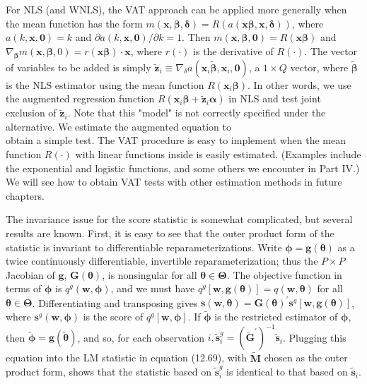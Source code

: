 \documentclass[10pt]{article}
\begin{document}
For NLS (and WNLS), the VAT approach can be applied more generally when the mean function has the form $m(\mathbf{x}, \boldsymbol{\beta}, \boldsymbol{\delta})=R(a(\mathbf{x} \boldsymbol{\beta}, \mathbf{x}, \boldsymbol{\delta}))$, where $a(k, \mathbf{x}, \mathbf{0})=k$ and $\partial a(k, \mathbf{x}, \mathbf{0}) / \partial k=1$. Then $m(\mathbf{x}, \boldsymbol{\beta}, \mathbf{0})=R(\mathbf{x} \boldsymbol{\beta})$ and $\nabla_{\boldsymbol{\beta}} m(\mathbf{x}, \boldsymbol{\beta}, 0)=r(\mathbf{x} \boldsymbol{\beta}) \cdot \mathbf{x}$, where $r(\cdot)$ is the derivative of $R(\cdot)$. The vector of variables to be added is simply $\tilde{\mathbf{z}}_{i} \equiv \nabla_{\delta} a\left(\mathbf{x}_{i} \tilde{\boldsymbol{\beta}}, \mathbf{x}_{i}, \mathbf{0}\right)$, a $1 \times Q$ vector, where $\tilde{\boldsymbol{\beta}}$ is the NLS estimator using the mean function $R\left(\mathbf{x}_{i} \boldsymbol{\beta}\right)$. In other words, we use the augmented regression function $R\left(\mathbf{x}_{i} \boldsymbol{\beta}+\tilde{\mathbf{z}}_{i} \boldsymbol{\alpha}\right)$ in NLS and test joint exclusion of $\tilde{\mathbf{z}}_{i}$. Note that this "model" is not correctly specified under the alternative. We estimate the augmented equation to\\
obtain a simple test. The VAT procedure is easy to implement when the mean function $R(\cdot)$ with linear functions inside is easily estimated. (Examples include the exponential and logistic functions, and some others we encounter in Part IV.) We will see how to obtain VAT tests with other estimation methods in future chapters.

The invariance issue for the score statistic is somewhat complicated, but several results are known. First, it is easy to see that the outer product form of the statistic is invariant to differentiable reparameterizations. Write $\boldsymbol{\phi}=\mathbf{g}(\boldsymbol{\theta})$ as a twice continuously differentiable, invertible reparameterization; thus the $P \times P$ Jacobian of $\mathbf{g}$, $\mathbf{G}(\boldsymbol{\theta})$, is nonsingular for all $\boldsymbol{\theta} \in \boldsymbol{\Theta}$. The objective function in terms of $\boldsymbol{\phi}$ is $q^{g}(\mathbf{w}, \boldsymbol{\phi})$, and we must have $q^{g}[\mathbf{w}, \mathbf{g}(\boldsymbol{\theta})]=q(\mathbf{w}, \boldsymbol{\theta})$ for all $\boldsymbol{\theta} \in \boldsymbol{\Theta}$. Differentiating and transposing gives $\mathbf{s}(\mathbf{w}, \boldsymbol{\theta})=\mathbf{G}(\boldsymbol{\theta})^{\prime} \mathbf{s}^{g}[\mathbf{w}, \mathbf{g}(\boldsymbol{\theta})]$, where $\mathbf{s}^{g}(\mathbf{w}, \boldsymbol{\phi})$ is the score of $q^{g}[\mathbf{w}, \boldsymbol{\phi}]$. If $\tilde{\boldsymbol{\phi}}$ is the restricted estimator of $\boldsymbol{\phi}$, then $\tilde{\boldsymbol{\phi}}=\mathbf{g}(\tilde{\boldsymbol{\theta}})$, and so, for each observation $i, \tilde{\mathbf{s}}_{i}^{g}=\left(\tilde{\mathbf{G}}^{\prime}\right)^{-1} \tilde{\mathbf{s}}_{i}$. Plugging this equation into the LM statistic in equation (12.69), with $\tilde{\mathbf{M}}$ chosen as the outer product form, shows that the statistic based on $\tilde{\mathbf{s}}_{i}^{g}$ is identical to that based on $\tilde{\mathbf{s}}_{i}$.
\end{document}
